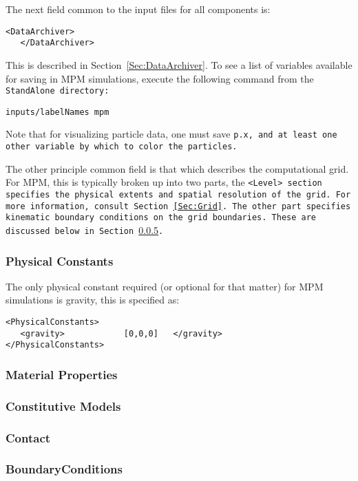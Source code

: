 The next field common to the input files for all components is:

\begin{Verbatim}[fontsize=\footnotesize]
   <DataArchiver>
   </DataArchiver>
\end{Verbatim}
This is described in Section~\ref{Sec:DataArchiver}.  To see a list of
variables available for saving in MPM simulations, execute the following
command from the \tt StandAlone \normalfont directory:

\begin{Verbatim}[fontsize=\footnotesize]
inputs/labelNames mpm
\end{Verbatim}
Note that for visualizing particle data, one must save \tt p.x, \normalfont
and at least one other variable by which to color the particles.

The other principle common field is that which describes the computational
grid.  For MPM, this is typically broken up into two parts, the
\tt <Level> \normalfont section specifies the physical extents and spatial
resolution of the grid.  For more information, consult Section~\ref{Sec:Grid}.
The other part specifies kinematic boundary conditions on the grid boundaries.
These are discussed below in Section~\ref{Sec:MPM_BCs}.

\subsubsection{Physical Constants}
The only physical constant required (or optional for that matter) for
MPM simulations is gravity, this is specified as:

\begin{Verbatim}[fontsize=\footnotesize]
<PhysicalConstants>
   <gravity>            [0,0,0]   </gravity>
</PhysicalConstants>
\end{Verbatim}

\subsubsection{Material Properties}
\subsubsection{Constitutive Models} \label{ConstitutiveModels}
\subsubsection{Contact}  \label{Contact}
\subsubsection{BoundaryConditions} \label{Sec:MPM_BCs}

